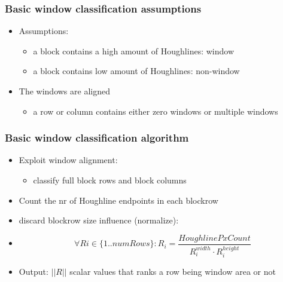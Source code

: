 \documentclass{beamer}
\begin{document}
\frame
{
	\frametitle{Basic window classification assumptions}
	\begin{itemize}
	\item <+-| alert@+> Assumptions:
		\begin{itemize}
		\item <+-| alert@+> a block contains a high amount of Houghlines: window
		\item <+-| alert@+> a block contains low amount of Houghlines: non-window
		\end{itemize}
	\item <+-| alert@+> The windows are aligned 
		\begin{itemize}
		\item <+-| alert@+> a row or column contains either zero windows or multiple windows 
		\end{itemize}
	\end{itemize}
}

\frame
{
	\frametitle{Basic window classification algorithm}
	\begin{itemize}
	\item <+-| alert@+> Exploit window alignment: 
		\begin{itemize}
		\item classify full block rows and block columns
		\end{itemize}
	\item <+-| alert@+> Count the nr of Houghline endpoints in each blockrow
	\item <+-| alert@+> discard blockrow size influence (normalize):
	\item <+-| alert@+> \[\forall Ri\in \{1..numRows\} : R_i = \frac{HoughlinePxCount}{R_i^{width} \cdot R_i^{height}}\]
	\item <+-| alert@+> Output: $||R||$ scalar values that ranks a row being window area or not
	\end{itemize}
	

}

\frame
{
}

\frame
{
}

\frame
{
}
\end{document}

